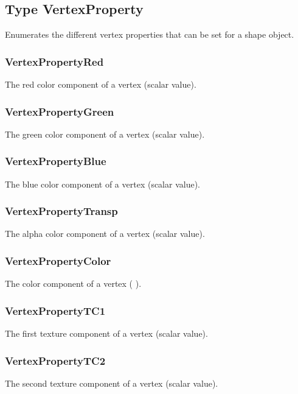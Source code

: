 \subsection{Type VertexProperty \label{T:VertexProperty}}
Enumerates the different vertex properties that can be set for a shape object.

\subsubsection{VertexPropertyRed \label{T:VertexProperty|VertexPropertyRed}}
The red color component of a vertex (scalar value).

\subsubsection{VertexPropertyGreen \label{T:VertexProperty|VertexPropertyGreen}}
The green color component of a vertex (scalar value).

\subsubsection{VertexPropertyBlue \label{T:VertexProperty|VertexPropertyBlue}}
The blue color component of a vertex (scalar value).

\subsubsection{VertexPropertyTransp \label{T:VertexProperty|VertexPropertyTransp}}
The alpha color component of a vertex (scalar value).

\subsubsection{VertexPropertyColor \label{T:VertexProperty|VertexPropertyColor}}
The color component of a vertex ( ).

\subsubsection{VertexPropertyTC1 \label{T:VertexProperty|VertexPropertyTC1}}
The first texture component of a vertex (scalar value).


\subsubsection{VertexPropertyTC2 \label{T:VertexProperty|VertexPropertyTC2}}
The second texture component of a vertex (scalar value).


